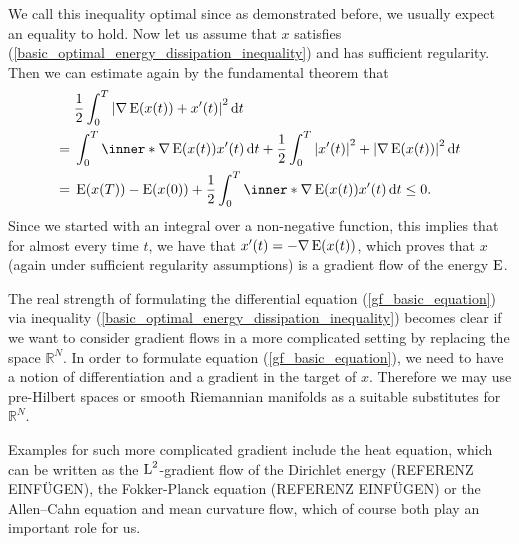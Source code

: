 We call this inequality optimal since as demonstrated before, we usually expect an equality to hold.
Now let us assume that $ x $ satisfies (\ref{basic_optimal_energy_dissipation_inequality}) and has sufficient regularity.
Then we can estimate again by the fundamental theorem that
\begin{align*}
	& \frac{ 1 }{ 2 }
	\int_{ 0 }^{ T }
		\abs{
			\nabla \energy ( x ( t ) )
			+
			x' ( t ) 
		}^{ 2 }
	\dd{ t }
	\\
	={} &
	\int_{ 0 }^{ T }
		\inner*{ \nabla \energy ( x ( t ) ) }{ x' ( t ) }
	\dd{ t }
	+
	\frac{ 1 }{ 2 }
	\int_{ 0 }^{ T }
		\abs{ x' ( t ) }^{ 2 }
		+
		\abs{ \nabla \energy ( x ( t ) ) }^{ 2 }
	\dd{ t }
	\\
	={} &
	\energy ( x ( T ) ) - \energy ( x ( 0 ) ) 
	+
	\frac{ 1 }{ 2 }
	\int_{ 0 }^{ T }
		\inner*{ \nabla \energy ( x ( t ) ) }{ x' ( t ) }
	\dd{ t }
	\leq 0.
\end{align*}
Since we started with an integral over a non-negative function, this implies that for almost every time $ t $, we have that $ x' ( t ) = - \nabla \operatorname{E} ( x ( t ) ) $, which proves that $ x $ (again under sufficient regularity assumptions) is a gradient flow of the energy $ \operatorname{E} $.

The real strength of formulating the differential equation (\ref{gf_basic_equation}) via inequality (\ref{basic_optimal_energy_dissipation_inequality}) becomes clear if we want to consider gradient flows in a more complicated setting by replacing the space $ \mathbb{ R }^{ N } $. In order to formulate equation (\ref{gf_basic_equation}), we need to have a notion of differentiation and a gradient in the target of $ x $. Therefore we may use pre-Hilbert spaces or smooth Riemannian manifolds as a suitable substitutes for $ \mathbb{ R }^{ N } $. 

Examples for such more complicated gradient include the heat equation, which can be written as the $ \operatorname{L}^{ 2 } $-gradient flow of the Dirichlet energy (REFERENZ EINFÜGEN), 
the Fokker-Planck equation (REFERENZ EINFÜGEN) or the Allen--Cahn equation and mean curvature flow, which of course both play an important role for us.
\begin{comment}
A first example for a generalization is therefore the heat equation $ \partial_{ t } u - \Delta u = 0 $ for some open and bounded set $ \Omega $. As our space, we shall take $ \mathrm{ H }_{ 0 }^{ 1 } ( \Omega ) $ equipped with the inner product
\begin{equation*}
	\inner*{ u }{ v }
	\coloneqq
	\int
		\inner*{ u }{ v }
	\dd{ x }.
\end{equation*}
Our energy is given by the Dirichlet functional
\begin{equation*}
	\energy ( u ) \coloneqq
	\frac{ 1 }{ 2 }
	\int
		\abs{ \nabla u }^{ 2 }
	\dd{ x }
\end{equation*}
Then we can compute that at least on $ \mathrm{ H }_{ 0 }^{ 1 } \cap \mathrm{ H }^{ 2 } ( \Omega ) $, the Fréchet derivative of $ \energy $ is given by $ \diff ( E ) ( u ) [ v ] = - \int \Delta u v \dd{ x } $.
\end{comment}